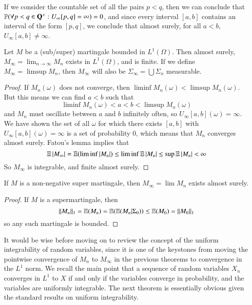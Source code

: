 If we consider the countable set of all the pairs $p < q$, then we can conclude that $\operatorname{\mathbb{P}}(\forall p < q \in \mathbf{Q}^+: U_\infty[p,q] = \infty) = 0$, and since every interval $[a,b]$ contains an interval of the form $[p,q]$, we conclude that almost surely, for all $a < b$, $U_\infty[a,b] \neq \infty$.

\begin{theorem}
    Let $M$ be a (sub/super) martingale bounded in $L^1(\Omega)$. Then almost surely, $M_\infty = \lim_{n \to \infty} M_n$ exists in $L^1(\Omega)$, and is finite. If we define $M_\infty = \limsup M_n$, then $M_\infty$ will also be $\Sigma_\infty = \bigcup \Sigma_n$ measurable.
\end{theorem}
\begin{proof}
    If $M_n(\omega)$ does not converge, then $\liminf M_n(\omega) < \limsup M_n(\omega)$. But this means we can find $a < b$ such that
    \[ \liminf M_n(\omega) < a < b < \limsup M_n(\omega) \]
    and $M_n$ must oscillate between $a$ and $b$ infinitely often, so $U_\infty[a,b](\omega) = \infty$. We have shown the set of all $\omega$ for which there exists $[a,b]$ with $U_\infty[a,b](\omega) = \infty$ is a set of probability 0, which means that $M_n$ converges almost surely. Fatou's lemma implies that
    \[ \operatorname{\mathbb{E}}|M_\infty| = \operatorname{\mathbb{E}}(\liminf |M_n|) \leq \liminf \operatorname{\mathbb{E}} |M_n| \leq \sup \operatorname{\mathbb{E}}|M_n| < \infty \]
    So $M_\infty$ is integrable, and finite almost surely.
\end{proof}

\begin{corollary}
    If $M$ is a non-negative super martingale, then $M_\infty = \lim M_n$ exists almost surely.
\end{corollary}
\begin{proof}
    If $M$ is a supermartingale, then
    \[ \|M_n\|_1 = \operatorname{\mathbb{E}}(M_n) = \operatorname{\mathbb{E}}(\operatorname{\mathbb{E}}(M_n|\Sigma_0)) \leq \operatorname{\mathbb{E}}(M_0) = \|M_0\|_1 \]
    so any such martingale is bounded.
\end{proof}

It would be wise before moving on to review the concept of the uniform integrability of random variables, since it is one of the keystones from moving the pointwise convergence of $M_n$ to $M_\infty$ in the previous theorems to convergence in the $L^1$ norm. We recall the main point that a sequence of random variables $X_n$ converges in $L^1$ to $X$ if and only if the variables converge in probability, and the variables are uniformly integrable. The next theorem is essentially obvious given the standard results on uniform integrability.

